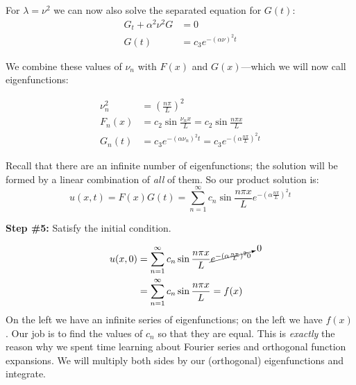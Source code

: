For $\lambda = \nu^2$ we can now also solve the separated equation for $G(t)$:
\begin{align*}
G_t + \alpha^2 \nu^2 G &= 0 \\
G(t) &= c_3 e^{-(\alpha \nu)^2 t}
\end{align*}

\noindent We combine these values of $\nu_n$ with $F(x)$ and $G(x)$---which we will now call eigenfunctions: 

\begin{align*}
\nu^2_n &= \left(\frac{n \pi}{L} \right)^2 \\
F_n(x) &= c_2\sin{\frac{\nu_n x}{L}} = c_2\sin{\frac{n \pi x}{L}} \\
G_n(t) &= c_3e^{-(\alpha \nu_n)^2 t} = c_3 e^{-(\alpha \frac{n \pi}{L})^2 t}
\end{align*}

\noindent Recall that there are an infinite number of eigenfunctions; the solution will be formed by a linear combination of \emph{all} of them.  So our product solution is:
\begin{equation*}
u(x,t) = F(x)G(t) = \sum\limits_{n=1}^{\infty} c_n \sin{\frac{n \pi x}{L}} e^{-(\alpha \frac{n \pi}{L})^2 t}
\end{equation*}

\vspace{0.5cm}

\noindent\textbf{Step \#5:} Satisfy the initial condition.

\begin{align*}
u(x,0) &= \sum\limits_{n=1}^{\infty}c_n \sin{\frac{n \pi x}{L}} \cancelto{0}{e^{-(\alpha \frac{n \pi}{L})^2 0}} \\
&= \sum\limits_{n=1}^{\infty}c_n \sin{\frac{n \pi x}{L}} = f(x)
\end{align*}
On the left we have an infinite series of eigenfunctions; on the left we have $f(x)$.  Our job is to find the values of $c_n$ so that they are equal.  This is \emph{exactly} the reason why we spent time learning about Fourier series and orthogonal function expansions.  We will multiply both sides by our (orthogonal) eigenfunctions and integrate.


